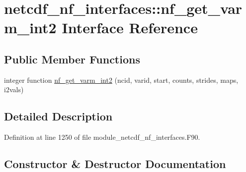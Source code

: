 \hypertarget{interfacenetcdf__nf__interfaces_1_1nf__get__varm__int2}{}\section{netcdf\+\_\+nf\+\_\+interfaces\+:\+:nf\+\_\+get\+\_\+varm\+\_\+int2 Interface Reference}
\label{interfacenetcdf__nf__interfaces_1_1nf__get__varm__int2}
\subsection*{Public Member Functions}
\begin{DoxyCompactItemize}
\item 
integer function \hyperlink{interfacenetcdf__nf__interfaces_1_1nf__get__varm__int2_ad24c6ed1563969d851e99472de2c7fb3}{nf\+\_\+get\+\_\+varm\+\_\+int2} (ncid, varid, start, counts, strides, maps, i2vals)
\end{DoxyCompactItemize}


\subsection{Detailed Description}


Definition at line 1250 of file module\+\_\+netcdf\+\_\+nf\+\_\+interfaces.\+F90.



\subsection{Constructor \& Destructor Documentation}
\mbox{\label{interfacenetcdf__nf__interfaces_1_1nf__get__varm__int2_ad24c6ed1563969d851e99472de2c7fb3}} 
